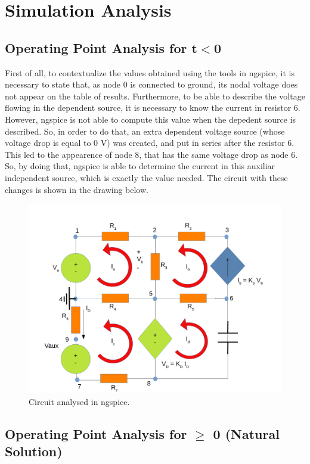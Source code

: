 \section{Simulation Analysis}\label{section:sim}

\subsection{Operating Point Analysis for t$<$0}

First of all, to contextualize the values obtained using the tools in ngspice, it is necessary to state that, as node 0 is connected to ground, its nodal voltage does not appear on the table of results. Furthermore, to be able to describe the voltage flowing in the dependent source, it is necessary to know the current in resistor 6. However, ngspice is not able to compute this value when the depedent source is described. So, in order to do that, an extra dependent voltage source (whose voltage drop is equal to 0 V) was created, and put in series after the resistor 6. This led to the appearence of node 8, that has the same voltage drop as node 6. So, by doing that, ngspice is able to determine the current in this auxiliar independent source, which is exactly the value needed.
 The circuit with these changes is shown in the drawing below.

\begin{figure}[ht] \centering
\includegraphics[width=0.8\linewidth]{sim1draw.pdf}
\caption{Circuit analysed in ngspice.}
\label{simdraw}
\end{figure}


\subsection{Operating Point Analysis for $\ge$ 0 (Natural Solution)}



